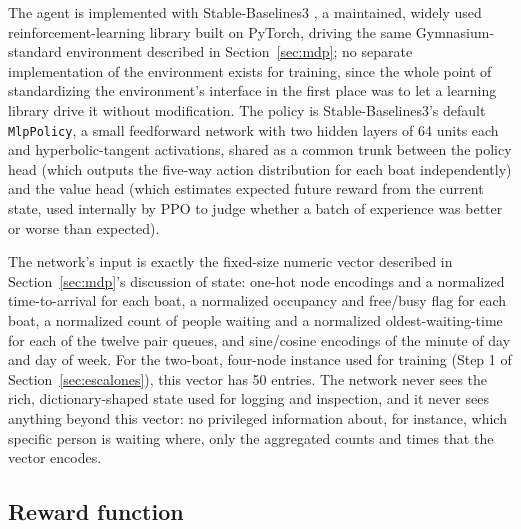 \documentclass[11pt,a4paper]{article}
\begin{document}
The agent is implemented with Stable-Baselines3 \citep{Raffin2021}, a maintained, widely used reinforcement-learning library built on PyTorch, driving the same Gymnasium-standard environment \citep{Brockman2016} described in Section~\ref{sec:mdp}; no separate implementation of the environment exists for training, since the whole point of standardizing the environment's interface in the first place was to let a learning library drive it without modification. The policy is Stable-Baselines3's default \texttt{MlpPolicy}, a small feedforward network with two hidden layers of 64 units each and hyperbolic-tangent activations, shared as a common trunk between the policy head (which outputs the five-way action distribution for each boat independently) and the value head (which estimates expected future reward from the current state, used internally by PPO to judge whether a batch of experience was better or worse than expected).

The network's input is exactly the fixed-size numeric vector described in Section~\ref{sec:mdp}'s discussion of state: one-hot node encodings and a normalized time-to-arrival for each boat, a normalized occupancy and free/busy flag for each boat, a normalized count of people waiting and a normalized oldest-waiting-time for each of the twelve pair queues, and sine/cosine encodings of the minute of day and day of week. For the two-boat, four-node instance used for training (Step 1 of Section~\ref{sec:escalones}), this vector has 50 entries. The network never sees the rich, dictionary-shaped state used for logging and inspection, and it never sees anything beyond this vector: no privileged information about, for instance, which specific person is waiting where, only the aggregated counts and times that the vector encodes.

\subsection{Reward function}
\label{sec:reward-agent}
\end{document}

